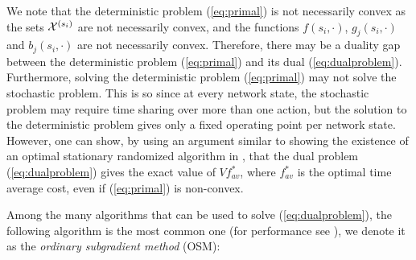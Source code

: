 \documentclass[journal]{IEEEtran}
\newcommand{\script}[1]{{{\cal{#1} }}}
\begin{document}
We note that the deterministic problem (\ref{eq:primal}) is not necessarily convex as the sets $\script{X}^{(s_i)}$ are not necessarily convex, and the functions $f(s_i, \cdot)$, $g_j(s_i, \cdot)$ and $b_j(s_i, \cdot)$ are not necessarily convex. Therefore, there may be a duality gap between the deterministic problem (\ref{eq:primal}) and its dual (\ref{eq:dualproblem}). Furthermore,  solving the deterministic problem (\ref{eq:primal}) may not solve the stochastic problem. This is so since  at every network state, the stochastic problem may require time sharing over more than one action, but the solution to the deterministic problem gives only a fixed operating point per network state.  However, one can show, by using an argument similar to showing the existence of an optimal stationary randomized algorithm in \cite{huangneelypricing}, that the dual problem (\ref{eq:dualproblem}) gives the exact  value of $Vf_{av}^*$, where $f_{av}^*$ is the optimal time average cost,  even if (\ref{eq:primal}) is non-convex. 




Among the many algorithms that can be used to solve (\ref{eq:dualproblem}), the following algorithm is the most common one (for performance see \cite{bertsekasoptbook}), we denote it as the \emph{ordinary subgradient method} (OSM):
\end{document}
